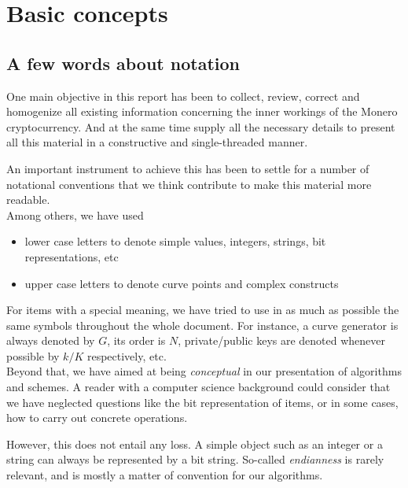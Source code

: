 



\chapter{Basic concepts}
\label{chap:basicConcepts}


\section{A few words about notation}

One main objective in this report has been to collect, review, correct and homogenize all existing information
concerning the inner workings of the Monero cryptocurrency.
And at the same time supply all the necessary details to present all this material in a constructive and single-threaded
manner.

An important instrument to achieve this has been to settle for a number of notational conventions that we think
contribute to make this material more readable.
\\

Among others, we have used
\begin{itemize}
\item lower case letters to denote simple values, integers, strings, bit representations, etc
\item upper case letters to denote curve points and complex constructs
\end{itemize}

For items with a special meaning, we have tried to use in as much as possible the same symbols throughout the
whole document. 
For instance,
a curve generator is always denoted by \(G\), its order is \(N\), private/public keys are denoted whenever possible by \(k/K\) 
respectively, etc.
\\

Beyond that, we have aimed at being {\em conceptual} in our presentation of algorithms and schemes.
A reader with a computer science background could consider that we have neglected
 questions like the bit representation of items, or in some cases, how to carry out concrete operations.

However, this does not entail any loss.
A simple object such as an integer or a string can always be represented by a bit string. 
So-called {\em endianness} is rarely relevant, and is mostly a matter of convention for our algorithms.

